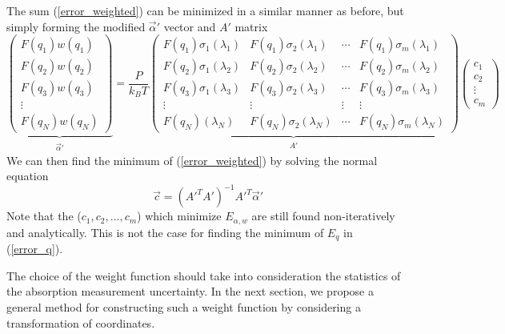\documentclass[12pt]{report}
\begin{document}
	The sum (\ref{error_weighted}) can be minimized in a similar manner as before, but simply forming the modified $\vec{\alpha}'$ vector and $A'$ matrix
	\begin{equation} \label{fit_spectrum_weighted}
		\underbrace{\begin{pmatrix}
				F(q_1) w(q_1) \\
				F(q_2) w(q_2) \\
				F(q_3) w(q_3) \\
				\vdots \\
				F(q_N) w(q_N)
		\end{pmatrix}}_{\begin{matrix}\vec{\alpha}' \end{matrix}} %
		=
		\underbrace{\frac{P}{k_B T}
			\begin{pmatrix}
				F(q_1)\sigma_1(\lambda_1) &  F(q_1)\sigma_2(\lambda_1) & \cdots & F(q_1)\sigma_m(\lambda_1) \\
				F(q_2)\sigma_1(\lambda_2) &  F(q_2)\sigma_2(\lambda_2) & \cdots & F(q_2)\sigma_m(\lambda_2) \\
				F(q_3)\sigma_1(\lambda_3) &  F(q_3)\sigma_2(\lambda_3) & \cdots & F(q_3)\sigma_m(\lambda_3) \\
				\vdots & \vdots& \vdots & \vdots \\
				F(q_N)(\lambda_N) & F(q_N)\sigma_2(\lambda_N) & \cdots &  F(q_N)\sigma_m(\lambda_N)
		\end{pmatrix}}_{\begin{matrix} A' \end{matrix}}
		\begin{pmatrix}
			c_1 \\
			c_2 \\
			\vdots \\
			c_m
		\end{pmatrix}
	\end{equation}
	We can then find the minimum of (\ref{error_weighted}) by solving the normal equation
	\begin{equation} \label{leastSquares_weighted}
		\vec{c} = (A'^T A')^{-1}A'^T \vec{\alpha}'
	\end{equation}
	Note that the ($c_1, c_2, \ldots, c_m$) which minimize $E_{\alpha,w}$ are still found non-iteratively and analytically. This is not the case for finding the minimum of $E_q$ in (\ref{error_q}).
	
	The choice of the weight function should take into consideration the statistics of the absorption measurement uncertainty. In the next section, we propose a general method for constructing such a weight function by considering a transformation of coordinates.
	
\end{document}
